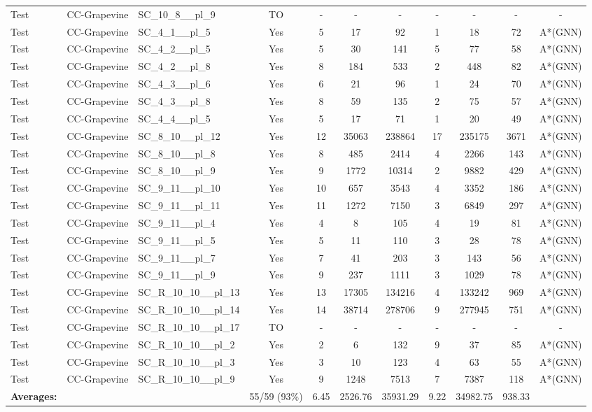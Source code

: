 \documentclass{article}
\begin{document}
\begin{tabular}{lllcccccccc}
Test & CC-Grapevine & SC\_10\_8\_\_pl\_9 & TO & - & - & - & - & - & - & - \\
Test & CC-Grapevine & SC\_4\_1\_\_pl\_5 & Yes & 5 & 17 & 92 & 1 & 18 & 72 & A*(GNN) \\
Test & CC-Grapevine & SC\_4\_2\_\_pl\_5 & Yes & 5 & 30 & 141 & 5 & 77 & 58 & A*(GNN) \\
Test & CC-Grapevine & SC\_4\_2\_\_pl\_8 & Yes & 8 & 184 & 533 & 2 & 448 & 82 & A*(GNN) \\
Test & CC-Grapevine & SC\_4\_3\_\_pl\_6 & Yes & 6 & 21 & 96 & 1 & 24 & 70 & A*(GNN) \\
Test & CC-Grapevine & SC\_4\_3\_\_pl\_8 & Yes & 8 & 59 & 135 & 2 & 75 & 57 & A*(GNN) \\
Test & CC-Grapevine & SC\_4\_4\_\_pl\_5 & Yes & 5 & 17 & 71 & 1 & 20 & 49 & A*(GNN) \\
Test & CC-Grapevine & SC\_8\_10\_\_pl\_12 & Yes & 12 & 35063 & 238864 & 17 & 235175 & 3671 & A*(GNN) \\
Test & CC-Grapevine & SC\_8\_10\_\_pl\_8 & Yes & 8 & 485 & 2414 & 4 & 2266 & 143 & A*(GNN) \\
Test & CC-Grapevine & SC\_8\_10\_\_pl\_9 & Yes & 9 & 1772 & 10314 & 2 & 9882 & 429 & A*(GNN) \\
Test & CC-Grapevine & SC\_9\_11\_\_pl\_10 & Yes & 10 & 657 & 3543 & 4 & 3352 & 186 & A*(GNN) \\
Test & CC-Grapevine & SC\_9\_11\_\_pl\_11 & Yes & 11 & 1272 & 7150 & 3 & 6849 & 297 & A*(GNN) \\
Test & CC-Grapevine & SC\_9\_11\_\_pl\_4 & Yes & 4 & 8 & 105 & 4 & 19 & 81 & A*(GNN) \\
Test & CC-Grapevine & SC\_9\_11\_\_pl\_5 & Yes & 5 & 11 & 110 & 3 & 28 & 78 & A*(GNN) \\
Test & CC-Grapevine & SC\_9\_11\_\_pl\_7 & Yes & 7 & 41 & 203 & 3 & 143 & 56 & A*(GNN) \\
Test & CC-Grapevine & SC\_9\_11\_\_pl\_9 & Yes & 9 & 237 & 1111 & 3 & 1029 & 78 & A*(GNN) \\
Test & CC-Grapevine & SC\_R\_10\_10\_\_pl\_13 & Yes & 13 & 17305 & 134216 & 4 & 133242 & 969 & A*(GNN) \\
Test & CC-Grapevine & SC\_R\_10\_10\_\_pl\_14 & Yes & 14 & 38714 & 278706 & 9 & 277945 & 751 & A*(GNN) \\
Test & CC-Grapevine & SC\_R\_10\_10\_\_pl\_17 & TO & - & - & - & - & - & - & - \\
Test & CC-Grapevine & SC\_R\_10\_10\_\_pl\_2 & Yes & 2 & 6 & 132 & 9 & 37 & 85 & A*(GNN) \\
Test & CC-Grapevine & SC\_R\_10\_10\_\_pl\_3 & Yes & 3 & 10 & 123 & 4 & 63 & 55 & A*(GNN) \\
Test & CC-Grapevine & SC\_R\_10\_10\_\_pl\_9 & Yes & 9 & 1248 & 7513 & 7 & 7387 & 118 & A*(GNN) \\
\textbf{Averages:} & & & 55/59 (93\%) & 6.45 & 2526.76 & 35931.29 & 9.22 & 34982.75 & 938.33 & \\
\bottomrule
\end{tabular}
\newpage
\end{document}
